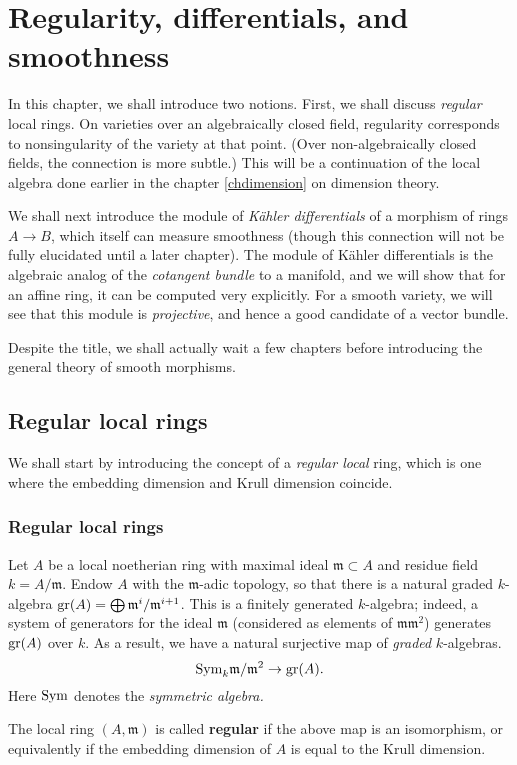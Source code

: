 \chapter{Regularity, differentials, and smoothness}


In this chapter, we shall introduce two notions. First, we shall discuss
\emph{regular} local rings. On varieties over an algebraically closed field,
regularity corresponds to nonsingularity of the variety at that point.
(Over non-algebraically closed fields, the connection is more subtle.) This
will be a continuation of the local algebra done earlier in the chapter
\cref{chdimension}
on dimension theory.

We shall next introduce the module of \emph{K\"ahler differentials} of a
morphism of rings $A \to B$, which itself can measure smoothness (though this
connection will not be fully elucidated until a later chapter).
The module of K\"ahler differentials is the algebraic analog of the
\emph{cotangent bundle} to a manifold, and we will show that for an affine
ring, it can be computed very explicitly. For a 
smooth variety, we will see that this module is \emph{projective}, and hence a
good candidate of a vector bundle. 

Despite the title, we shall actually wait a few chapters before introducing the 
general theory of smooth morphisms. 



\section{Regular local rings}
We shall start by introducing the concept of a \emph{regular local} ring, which
is one where the embedding dimension and Krull dimension coincide.
\subsection{Regular local rings}

Let $A$ be a local noetherian ring with maximal ideal $\mathfrak{m} \subset A$
and residue field $k = A/\mathfrak{m}$.
Endow $A$ with the $\mathfrak{m}$-adic topology, so that there is a natural
graded $k$-algebra $\operatorname{gr}(A) = \bigoplus \mathfrak{m}^i/\mathfrak{m}^{i+1}$.
This is a finitely generated $k$-algebra; indeed, a system of generators for
the ideal $\mathfrak{m}$ (considered as elements of
$\mathfrak{m}\mathfrak{m}^2$) generates $\operatorname{gr}(A)$ over $k$.
As a result, we have a natural surjective map of \emph{graded} $k$-algebras.
\begin{equation} \label{reglocringmap} \mathrm{Sym}_k \mathfrak{m}/\mathfrak{m}^2 \to
\operatorname{gr}(A).  \end{equation}
Here $\mathrm{Sym}$ denotes the \emph{symmetric algebra.}
\begin{definition} The local ring $(A, \mathfrak{m})$ is called \textbf{regular} if the above map is
an isomorphism, or equivalently if the embedding dimension of $A$ is equal to
the Krull dimension.
\end{definition}

